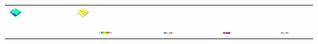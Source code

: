 \documentclass[prodmode,acmtochi]{acmsmall} %
\begin{document}
\begin{table}
{\begin{tabular}{m{} m{} m{} m{} m{}}
\includegraphics[width=0.22\textwidth]{images/render_3d/mean_slope_4.png} &
\includegraphics[width=0.22\textwidth]{images/render_3d/mean_forms_4.png}\\
%
&
\multicolumn{1}{c}{\includegraphics[width=0.22\textwidth]{images/legends/elevation_legend_4.pdf}} &
\multicolumn{1}{c}{\includegraphics[width=0.22\textwidth]{images/legends/diff_legend.pdf}} &
\multicolumn{1}{c}{\includegraphics[width=0.22\textwidth]{images/legends/slope_legend.pdf}} &
\multicolumn{1}{c}{\includegraphics[width=0.22\textwidth]{images/legends/forms_legend.pdf}}\\
%
\bottomrule
\end{tabular}}
\label{table:difference_experiment} 
\end{table}

\end{document}
